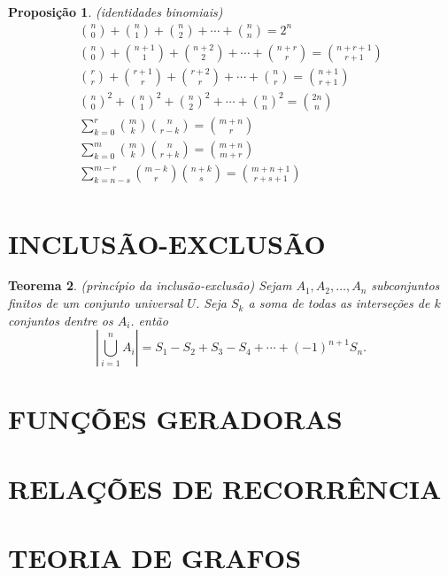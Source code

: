 \documentclass[12pt]{article}
\theoremstyle{plain}
\newtheorem{thm}{Teorema}[section]
\newtheorem{prop}[thm]{Proposição}
\theoremstyle{definition}
\theoremstyle{remark}
\begin{document}
\begin{prop} (identidades binomiais)
    \begin{gather}
        \binom{n}{0}+\binom{n}{1}+\binom{n}{2}+\cdots+\binom{n}{n} = 2^n \\
        \binom{n}{0}+\binom{n+1}{1}+\binom{n+2}{2}+\cdots+\binom{n+r}{r} = \binom{n+r+1}{r+1} \\
        \binom{r}{r}+\binom{r+1}{r}+\binom{r+2}{r}+\cdots+\binom{n}{r} = \binom{n+1}{r+1} \\
        \binom{n}{0}^2 + \binom{n}{1}^2 + \binom{n}{2}^2 + \cdots + \binom{n}{n}^2 = \binom{2n}{n} \\
        \sum_{k=0}^{r} \binom{m}{k}\binom{n}{r-k} = \binom{m+n}{r} \\
        \sum_{k=0}^{m} \binom{m}{k}\binom{n}{r+k} = \binom{m+n}{m+r} \\
        \sum_{k=n-s}^{m-r} \binom{m-k}{r}\binom{n+k}{s} = \binom{m+n+1}{r+s+1} \\
    \end{gather}
\end{prop}


\section{INCLUSÃO-EXCLUSÃO}

\begin{thm} (princípio da inclusão-exclusão)
    Sejam \(A_1, A_2, \ldots, A_n\) subconjuntos finitos de um conjunto universal \(U\). Seja \(S_k\) a soma de todas as interseções de \(k\) conjuntos dentre os \(A_i\). então
    \begin{equation}
        \left| \bigcup_{i=1}^{n} A_i \right| = S_1 - S_2 + S_3 - S_4 + \cdots + (-1)^{n+1} S_n.
    \end{equation}
\end{thm}

\section{FUNÇÕES GERADORAS}

\section{RELAÇÕES DE RECORRÊNCIA}

\section{TEORIA DE GRAFOS}
\end{document}
